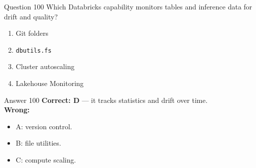 \documentclass[aspectratio=169,11pt]{beamer}
\begin{document}
	\begin{frame}{Question 100}
		Which Databricks capability monitors tables and inference data for drift and quality?
		\begin{enumerate}[label=\Alph*.]
			\item Git folders
			\item \texttt{dbutils.fs}
			\item Cluster autoscaling
			\item Lakehouse Monitoring
		\end{enumerate}
	\end{frame}
	\begin{frame}{Answer 100}
		\textbf{Correct: D} --- it tracks statistics and drift over time.\\
		\vspace{0.5em}
		\textbf{Wrong:}
		\begin{itemize}
			\item A: version control.
			\item B: file utilities.
			\item C: compute scaling.
		\end{itemize}
	\end{frame}
	
\end{document}
